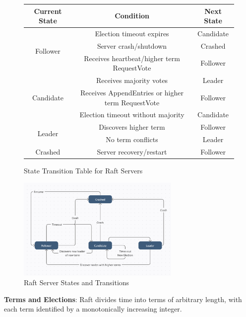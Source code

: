 \documentclass[a4paper]{llncs}
\renewcommand{\arraystretch}{0.85} %
\newcommand{\compacttable}[1]{%
  \begingroup
  \scriptsize
  \setlength{\tabcolsep}{2.5pt}%
  \renewcommand{\arraystretch}{0.8}%
  #1%
  \endgroup
}
\begin{document}
    \begin{figure}[h]
        \centering
        \compacttable{
        \begin{tabular}{|c|c|c|}
        \hline
        \textbf{Current State} & \textbf{Condition} & \textbf{Next State} \\
        \hline
        \multirow{3}{*}{Follower} & Election timeout expires & Candidate \\
        \cline{2-3}
         & Server crash/shutdown & Crashed \\
        \cline{2-3}
         & Receives heartbeat/higher term RequestVote & Follower \\
        \hline
        \multirow{3}{*}{Candidate} & Receives majority votes & Leader \\
        \cline{2-3}
         & Receives AppendEntries or higher term RequestVote & Follower \\
        \cline{2-3}
         & Election timeout without majority & Candidate \\
        \hline
        \multirow{2}{*}{Leader} & Discovers higher term & Follower \\
        \cline{2-3}
         & No term conflicts & Leader \\
        \hline
        Crashed & Server recovery/restart & Follower \\
        \hline
        \end{tabular}
        }
        \caption{State Transition Table for Raft Servers}
        \label{tab:state-transitions}
    \end{figure}
        \begin{figure}[h]
        \centering
        \includegraphics[width=0.7\textwidth]{StatesAndTransitions.png}
        \caption{Raft Server States and Transitions}
        \label{fig:raft-states}
    \end{figure}
    \textbf{Terms and Elections}: Raft divides time into terms of arbitrary
    length, with each term identified by a monotonically increasing integer.
\end{document}
